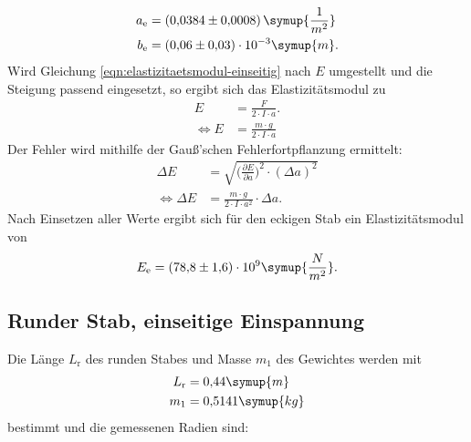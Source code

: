 \begin{equation*}
\begin{aligned}
a_{\text{e}} &= (0{,}0384 \pm 0{,}0008)\, \symup{\frac{1}{m^2}} \\
b_{\text{e}} &= (0{,}06 \pm 0{,}03)\cdot 10^{-3} \symup{m}.
\end{aligned}
\end{equation*}
Wird Gleichung \eqref{eqn:elastizitaetsmodul-einseitig} nach $E$ umgestellt und die Steigung passend eingesetzt, so ergibt sich das Elastizitätsmodul zu
 \begin{equation}
 \begin{aligned}
 E &= \frac{F}{2\cdot I \cdot a}. \\
 \iff E &= \frac{m\cdot g}{2 \cdot I \cdot a}
 \label{eqn:elastizitaetsmodul}
 \end{aligned}
 \end{equation}
Der Fehler wird mithilfe der Gauß'schen Fehlerfortpflanzung ermittelt:
 \begin{equation}
 \begin{aligned}
 \Delta E &= \sqrt{\biggl(\frac{\partial E}{\partial a}\biggr)^2\cdot (\Delta a)^2} \\
 \iff \Delta E &= \frac{m\cdot g}{2\cdot I \cdot a^2} \cdot \Delta a.
 \label{eqn:elastizitaetsmodul-fehler}
 \end{aligned}
 \end{equation}
Nach Einsetzen aller Werte ergibt sich für den eckigen Stab ein Elastizitätsmodul von
\begin{equation*}
E_{\text{e}} = (78{,}8 \pm 1{,}6)\cdot 10^9 \symup{\frac{N}{m^2}}.
\end{equation*}






\pagebreak 

\subsection{Runder Stab, einseitige Einspannung}

Die Länge $L_{\text{r}}$ des runden Stabes und Masse $m_1$ des Gewichtes werden mit
\begin{equation*}
\begin{aligned}
L_{\text{r}} &= 0{,}44 \symup{m} \\
m_1 &= 0{,}5141 \symup{kg}
\end{aligned}
\end{equation*}
bestimmt und die gemessenen Radien sind:

